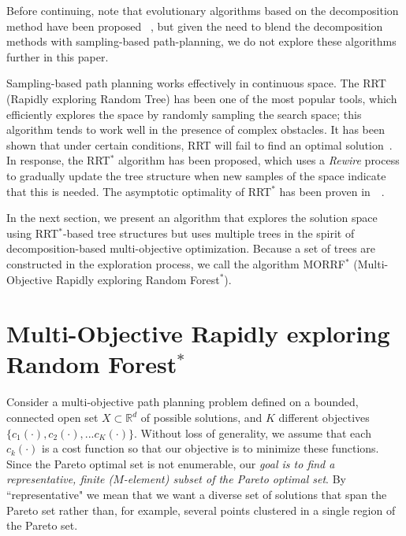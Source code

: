 \documentclass{article}
\begin{document}
Before continuing, note that evolutionary algorithms based on the decomposition method have been proposed ~\cite{6600851}, but given the need to blend the decomposition methods with sampling-based path-planning, we do not explore these algorithms further in this paper.

Sampling-based path planning works effectively in continuous space. 
The RRT (Rapidly exploring Random Tree) has been one of the most popular tools, which  efficiently explores the space by randomly sampling the search space; this algorithm tends to work well in the presence of complex obstacles.
It has been shown that under certain conditions, RRT will fail to find an optimal solution~\cite{Karaman.Frazzoli:RSS10}. 
In response, the RRT$^{*}$ algorithm has been proposed, which uses a \emph{Rewire} process to gradually update the tree structure when new samples of the space indicate that this is needed.
The asymptotic optimality of RRT$^{*}$ has been proven in~\cite{Karaman.Frazzoli:RSS10}~\cite{Karaman:2011:SAO:2000201.2000209}. 

In the next section, we present an algorithm that explores the solution space using RRT$^{*}$-based tree structures but uses multiple trees in the spirit of decomposition-based multi-objective optimization.
Because a set of trees are constructed in the exploration process, we call the algorithm MORRF$^{*}$ (Multi-Objective Rapidly exploring Random Forest$^{*}$).


\section{Multi-Objective Rapidly exploring Random Forest$^{*}$}
\label{sec:morrt}

Consider a multi-objective path planning problem defined on a bounded, connected open set $X\subset\mathbb{R}^d$ of possible solutions, and $K$ different objectives $\{c_{1}(\cdot), c_{2}(\cdot), ... c_{K}(\cdot)\}$. 
Without loss of generality, we assume that each $c_{k}(\cdot)$ is a cost function so that our objective is to minimize these functions.  
Since the Pareto optimal set is not enumerable, our {\em goal is to find a representative, finite ($M$-element) subset of the Pareto optimal set}.  
By ``representative" we mean that we want a diverse set of solutions that span the Pareto set rather than, for example, several points clustered in a single region of the Pareto set.  
\end{document}
